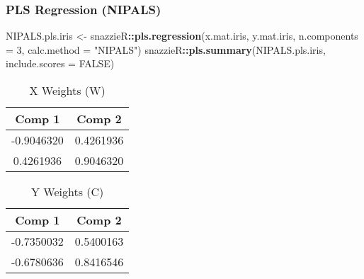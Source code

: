 \documentclass[
]{article}
\newenvironment{Shaded}{\begin{snugshade}}{\end{snugshade}}
\newcommand{\AttributeTok}[1]{\textcolor[rgb]{0.13,0.29,0.53}{#1}}
\newcommand{\ConstantTok}[1]{\textcolor[rgb]{0.56,0.35,0.01}{#1}}
\newcommand{\DecValTok}[1]{\textcolor[rgb]{0.00,0.00,0.81}{#1}}
\newcommand{\FunctionTok}[1]{\textcolor[rgb]{0.13,0.29,0.53}{\textbf{#1}}}
\newcommand{\NormalTok}[1]{#1}
\newcommand{\OtherTok}[1]{\textcolor[rgb]{0.56,0.35,0.01}{#1}}
\newcommand{\SpecialCharTok}[1]{\textcolor[rgb]{0.81,0.36,0.00}{\textbf{#1}}}
\newcommand{\StringTok}[1]{\textcolor[rgb]{0.31,0.60,0.02}{#1}}
\begin{document}
\subsubsection{PLS Regression (NIPALS)}\label{pls-regression-nipals}

\begin{Shaded}
\begin{Highlighting}[]
\NormalTok{NIPALS.pls.iris }\OtherTok{\textless{}{-}}\NormalTok{ snazzieR}\SpecialCharTok{::}\FunctionTok{pls.regression}\NormalTok{(x.mat.iris, y.mat.iris, }\AttributeTok{n.components =} \DecValTok{3}\NormalTok{, }\AttributeTok{calc.method =} \StringTok{"NIPALS"}\NormalTok{)}
\NormalTok{snazzieR}\SpecialCharTok{::}\FunctionTok{pls.summary}\NormalTok{(NIPALS.pls.iris, }\AttributeTok{include.scores =} \ConstantTok{FALSE}\NormalTok{)}
\end{Highlighting}
\end{Shaded}

\begin{minipage}[t]{0.48\linewidth}
\begin{table}[H]
\centering
\caption{\label{tab:unnamed-chunk-8}X Weights (W)}
\centering
\begin{tabular}[t]{|>{}c>{}c|}
\toprule
Comp 1 & Comp 2\\
\midrule
-0.9046320 & 0.4261936\\
0.4261936 & 0.9046320\\
\bottomrule
\end{tabular}
\end{table}
\end{minipage}\begin{minipage}[t]{0.48\linewidth}
\begin{table}[H]
\centering
\caption{\label{tab:unnamed-chunk-8}Y Weights (C)}
\centering
\begin{tabular}[t]{|>{}c>{}c|}
\toprule
Comp 1 & Comp 2\\
\midrule
-0.7350032 & 0.5400163\\
-0.6780636 & 0.8416546\\
\bottomrule
\end{tabular}
\end{table}
\end{minipage}
\end{document}
